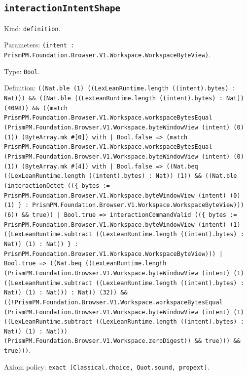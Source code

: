 \documentclass[11pt]{article}
\begin{document}
\subsection*{\texttt{interactionIntentShape}}
\noindent Kind: \texttt{definition}.\par
\noindent Parameters: \texttt{(intent : PrismPM.Foundation.Browser.V1.Workspace.WorkspaceByteView)}.\par
\noindent Type: \texttt{Bool}.\par
\noindent Definition: \texttt{((Nat.ble (1) ((LexLeanRuntime.length ((intent).bytes) : Nat))) \&\& ((Nat.ble ((LexLeanRuntime.length ((intent).bytes) : Nat)) (4098)) \&\& ((match PrismPM.Foundation.Browser.V1.Workspace.workspaceBytesEqual (PrismPM.Foundation.Browser.V1.Workspace.byteWindowView (intent) (0) (1)) (ByteArray.mk \#[0]) with | Bool.false => (match PrismPM.Foundation.Browser.V1.Workspace.workspaceBytesEqual (PrismPM.Foundation.Browser.V1.Workspace.byteWindowView (intent) (0) (1)) (ByteArray.mk \#[4]) with | Bool.false => ((Nat.beq ((LexLeanRuntime.length ((intent).bytes) : Nat)) (1)) \&\& ((Nat.ble (interactionOctet ((\{ bytes := PrismPM.Foundation.Browser.V1.Workspace.byteWindowView (intent) (0) (1) \} : PrismPM.Foundation.Browser.V1.Workspace.WorkspaceByteView))) (6)) \&\& true)) | Bool.true => interactionCommandValid ((\{ bytes := PrismPM.Foundation.Browser.V1.Workspace.byteWindowView (intent) (1) ((LexLeanRuntime.subtract ((LexLeanRuntime.length ((intent).bytes) : Nat)) (1) : Nat)) \} : PrismPM.Foundation.Browser.V1.Workspace.WorkspaceByteView))) | Bool.true => ((Nat.beq ((LexLeanRuntime.length (PrismPM.Foundation.Browser.V1.Workspace.byteWindowView (intent) (1) ((LexLeanRuntime.subtract ((LexLeanRuntime.length ((intent).bytes) : Nat)) (1) : Nat))) : Nat)) (32)) \&\& ((!PrismPM.Foundation.Browser.V1.Workspace.workspaceBytesEqual (PrismPM.Foundation.Browser.V1.Workspace.byteWindowView (intent) (1) ((LexLeanRuntime.subtract ((LexLeanRuntime.length ((intent).bytes) : Nat)) (1) : Nat))) (PrismPM.Foundation.Browser.V1.Workspace.zeroDigest)) \&\& true))) \&\& true)))}.\par
\noindent Axiom policy: \texttt{exact [Classical.choice, Quot.sound, propext]}.\par
\end{document}
